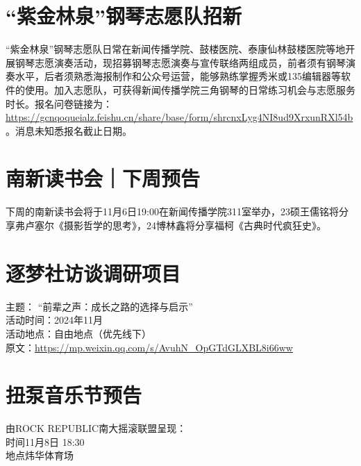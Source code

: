 \documentclass[letterpaper, 12pt]{article}
\begin{document}
\begin{multicols}{2}
\section{“紫金林泉”钢琴志愿队招新}
“紫金林泉”钢琴志愿队日常在新闻传播学院、鼓楼医院、泰康仙林鼓楼医院等地开展钢琴志愿演奏活动，现招募钢琴志愿演奏与宣传联络两组成员，前者须有钢琴演奏水平，后者须熟悉海报制作和公众号运营，能够熟练掌握秀米或135编辑器等软件的使用。加入志愿队，可获得新闻传播学院三角钢琴的日常练习机会与志愿服务时长。报名问卷链接为：\url{https://gcnqoqueialz.feishu.cn/share/base/form/shrcnxLyg4NI8ud9XrxunRXl54b}。消息未知悉报名截止日期。
\section{南新读书会｜下周预告}
下周的南新读书会将于11月6日19:00在新闻传播学院311室举办，23硕王儒铭将分享弗卢塞尔《摄影哲学的思考》，24博林鑫将分享福柯《古典时代疯狂史》。
\section{逐梦社访谈调研项目}
主题： “前辈之声：成长之路的选择与启示”\\
活动时间：2024年11月\\
活动地点：自由地点（优先线下）\\

原文：\url{https://mp.weixin.qq.com/s/AvuhN_OpGTdGLXBL8i66ww}


\section{扭泵音乐节预告}
由ROCK REPUBLIC南大摇滚联盟呈现：\\
时间11月8日 18:30\\
地点炜华体育场

\end{multicols} 
\end{document}
